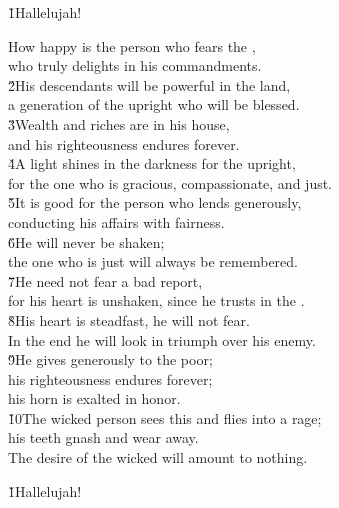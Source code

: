 \begin{poetry}
\poeml \v{1}Hallelujah!
\end{poetry}

\begin{poetry}
\poeml How happy is the person who fears the , \\
\poemll    who truly delights in his commandments. \\
\poeml \v{2}His descendants will be powerful in the land, \\
\poemll    a generation of the upright who will be blessed. \\
\poeml \v{3}Wealth and riches are in his house, \\
\poemll    and his righteousness endures forever. \\
\poeml \v{4}A light shines in the darkness for the upright, \\
\poemll    for the one who is gracious, compassionate, and just. \\
\poeml \v{5}It is good for the person who lends generously, \\
\poemll    conducting his affairs with fairness. \\
\poeml \v{6}He will never be shaken; \\
\poemll    the one who is just will always be remembered. \\
\poeml \v{7}He need not fear a bad report, \\
\poemll    for his heart is unshaken, since he trusts in the . \\
\poeml \v{8}His heart is steadfast, he will not fear. \\
\poemll    In the end he will look in triumph over his enemy. \\
\poeml \v{9}He gives generously to the poor; \\
\poemll    his righteousness endures forever; \\
\poemlll       his horn is exalted in honor. \\
\poeml \v{10}The wicked person sees this and flies into a rage; \\
\poemll    his teeth gnash and wear away. \\
\poeml The desire of the wicked will amount to nothing.
\end{poetry}

\begin{poetry}
\poeml \v{1}Hallelujah!
\end{poetry}

